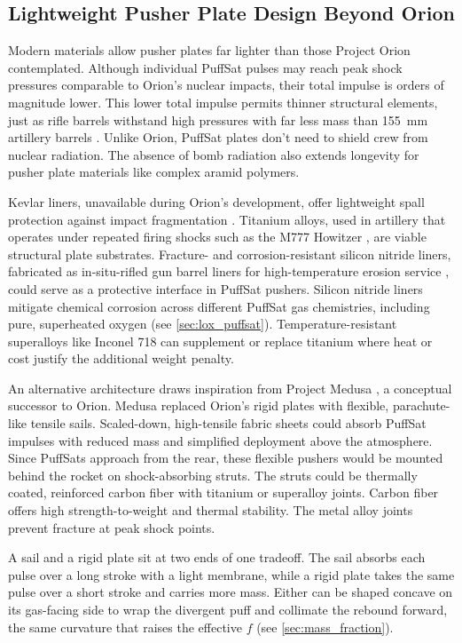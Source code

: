 \documentclass{article}
\begin{document}
\subsection{Lightweight Pusher Plate Design Beyond Orion}\label{sec:lightweight_pusher_plates}
Modern materials allow pusher plates far lighter than those Project Orion contemplated. Although individual PuffSat pulses may reach peak shock pressures comparable to Orion's nuclear impacts, their total impulse is orders of magnitude lower. This lower total impulse permits thinner structural elements, just as rifle barrels withstand high pressures with far less mass than \SI{155}{\milli\meter} artillery barrels \cite{cip_308win, ohara1999_155mm_breech}. Unlike Orion, PuffSat plates don't need to shield crew from nuclear radiation. The absence of bomb radiation also extends longevity for pusher plate materials like complex aramid polymers.

Kevlar liners, unavailable during Orion's development, offer lightweight spall protection against impact fragmentation \cite{aramid_ballistic_review}. Titanium alloys, used in artillery that operates under repeated firing shocks such as the M777 Howitzer \cite{titanium_m777}, are viable structural plate substrates. Fracture- and corrosion-resistant silicon nitride liners, fabricated as in-situ-rifled gun barrel liners for high-temperature erosion service \cite{si3n4_gun_liner}, could serve as a protective interface in PuffSat pushers. Silicon nitride liners mitigate chemical corrosion across different PuffSat gas chemistries, including pure, superheated oxygen (see \autoref{sec:lox_puffsat}). Temperature-resistant superalloys like Inconel 718 \cite{inconel_718_strong} can supplement or replace titanium where heat or cost justify the additional weight penalty.

An alternative architecture draws inspiration from Project Medusa \cite{solem_medusa}, a conceptual successor to Orion. Medusa replaced Orion's rigid plates with flexible, parachute-like tensile sails. Scaled-down, high-tensile fabric sheets could absorb PuffSat impulses with reduced mass and simplified deployment above the atmosphere. Since PuffSats approach from the rear, these flexible pushers would be mounted behind the rocket on shock-absorbing struts. The struts could be thermally coated, reinforced carbon fiber with titanium or superalloy joints. Carbon fiber offers high strength-to-weight and thermal stability. The metal alloy joints prevent fracture at peak shock points.

A sail and a rigid plate sit at two ends of one tradeoff. The sail absorbs each pulse over a long stroke with a light membrane, while a rigid plate takes the same pulse over a short stroke and carries more mass. Either can be shaped concave on its gas-facing side to wrap the divergent puff and collimate the rebound forward, the same curvature that raises the effective $f$ (see \autoref{sec:mass_fraction}).
\end{document}
